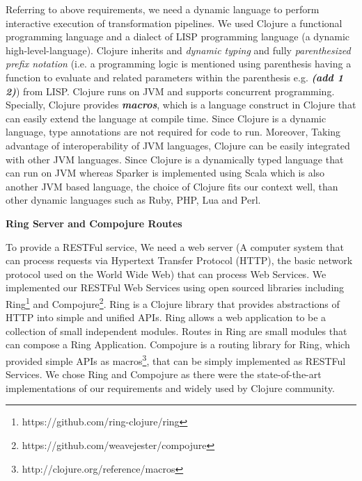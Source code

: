Referring to above requirements, we need a dynamic language to perform interactive execution of transformation pipelines. We used Clojure \cite{clojure} a functional programming language and a dialect of LISP\cite{lisp} programming language (a dynamic high-level-language). Clojure inherits  and \textit{dynamic typing} and fully \textit{parenthesized prefix notation} (i.e. a programming logic is mentioned using parenthesis having a function to evaluate and related parameters within the parenthesis e.g. \textit{\textbf{(add 1 2)}}) from LISP. Clojure runs on JVM and supports concurrent programming. Specially, Clojure provides \textit{\textbf{macros}}, which is a language construct in Clojure that can easily extend the language at compile time. Since Clojure is a dynamic language, type annotations are not required for code to run. Moreover, Taking advantage of  interoperability of JVM languages, Clojure can be easily integrated with other JVM languages. Since Clojure is a dynamically typed language that can run on JVM whereas Sparker is implemented using Scala which is also another JVM based language, the choice of Clojure fits our context well, than other dynamic languages such as Ruby, PHP, Lua and Perl. 

\textbf{Ring Server and Compojure Routes}

To provide a RESTFul service, We need a web server (A computer system that can process requests via Hypertext Transfer Protocol (HTTP), the basic network protocol used on the World Wide Web) that can process Web Services. We implemented our RESTFul Web Services using open sourced libraries including Ring\footnote{https://github.com/ring-clojure/ring} and Compojure\footnote{https://github.com/weavejester/compojure}. Ring is a Clojure library that provides abstractions of HTTP into simple and unified APIs. Ring allows a web application to be a collection of small independent modules. Routes in Ring are small modules that can compose a Ring Application. Compojure is a routing library for Ring, which provided simple APIs as macros\footnote{http://clojure.org/reference/macros}, that can be simply implemented as RESTFul Services. We chose Ring and Compojure as there were the state-of-the-art implementations of our requirements and widely used by Clojure community. 
